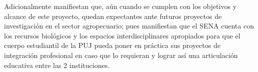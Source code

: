 Adicionalmente manifiestan que, aún cuando se cumplen con los objetivos y alcance de este proyecto, quedan expectantes ante futuros proyectos de investigación en el sector agropecuario; pues manifiestan que el SENA cuenta con los recursos biológicos y los espacios interdisciplinares apropiados para que el cuerpo estudiantil de la PUJ pueda poner en práctica sus proyectos de integración profesional en caso que lo requieran y lograr así una articulación educativa entre las 2 instituciones.
